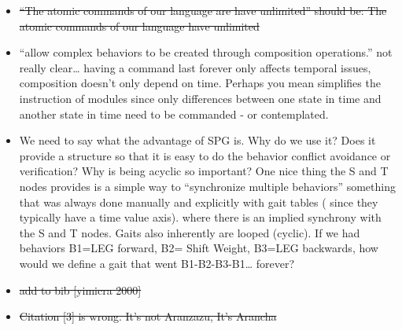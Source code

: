 \documentclass[12pt]{article}
\begin{document}
\begin{itemize}
\item \sout{“The atomic commands of our language are have unlimited” should be: The atomic commands of our language have unlimited}
\item “allow complex behaviors to be created through composition operations.” not really clear… having a command last forever only affects temporal issues, composition doesn’t only depend on time. Perhaps you mean simplifies the instruction of modules since only differences between one state in time and another state in time need to be commanded - or contemplated.
\item We need to say what the advantage of SPG is. Why do we use it? Does it provide a structure so that it is easy to do the behavior conflict avoidance or verification? Why is being acyclic so important? One nice thing the S and T nodes provides is a simple way to “synchronize multiple behaviors” something that was always done manually and explicitly with gait tables ( since they typically have a time value axis). where there is an implied synchrony with the S and T nodes. Gaits also inherently are looped (cyclic). If we had behaviors B1=LEG forward, B2= Shift Weight, B3=LEG backwards, how would we define a gait that went B1-B2-B3-B1… forever?
\item \sout{add to bib [yimicra 2000]}
\item \sout{Citation [3] is wrong. It’s not Aranzazu, It’s Arancha}
\end{itemize}
\end{document}
